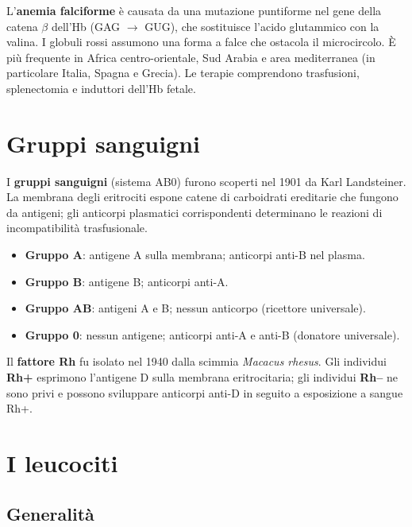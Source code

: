 L'\textbf{anemia falciforme} è causata da una mutazione puntiforme nel gene
della catena $\beta$ dell'Hb (GAG $\rightarrow$ GUG), che sostituisce l'acido
glutammico con la valina. I globuli rossi assumono una forma a falce che
ostacola il microcircolo. È più frequente in Africa centro-orientale, Sud
Arabia e area mediterranea (in particolare Italia, Spagna e Grecia). Le
terapie comprendono trasfusioni, splenectomia e induttori dell'Hb fetale.

\section{Gruppi sanguigni}

I \textbf{gruppi sanguigni} (sistema AB0) furono scoperti nel 1901 da Karl
Landsteiner. La membrana degli eritrociti espone catene di carboidrati
ereditarie che fungono da antigeni; gli anticorpi plasmatici corrispondenti
determinano le reazioni di incompatibilità trasfusionale.

\begin{itemize}
  \item \textbf{Gruppo A}: antigene A sulla membrana; anticorpi anti-B nel plasma.
  \item \textbf{Gruppo B}: antigene B; anticorpi anti-A.
  \item \textbf{Gruppo AB}: antigeni A e B; nessun anticorpo (ricettore
    universale).
  \item \textbf{Gruppo 0}: nessun antigene; anticorpi anti-A e anti-B
    (donatore universale).
\end{itemize}

Il \textbf{fattore Rh} fu isolato nel 1940 dalla scimmia \textit{Macacus
rhesus}. Gli individui \textbf{Rh+} esprimono l'antigene D sulla membrana
eritrocitaria; gli individui \textbf{Rh--} ne sono privi e possono sviluppare
anticorpi anti-D in seguito a esposizione a sangue Rh+.

\section{I leucociti}

\subsection{Generalità}

